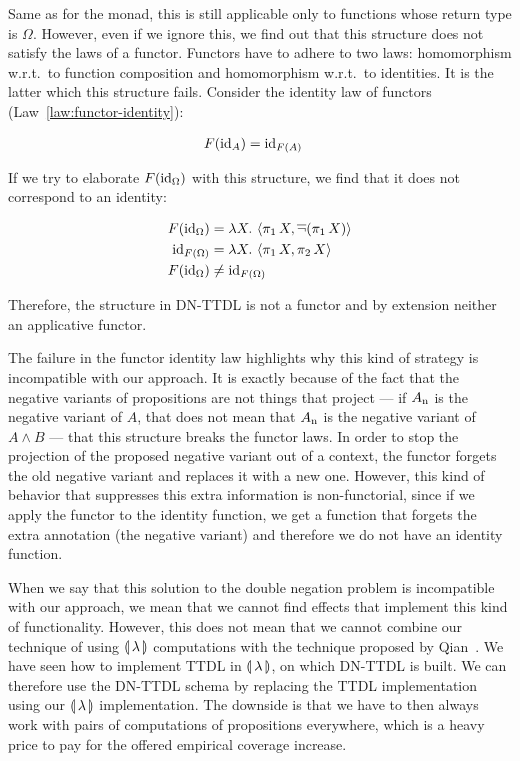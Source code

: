 Same as for the monad, this is still applicable only to functions whose
return type is $\Omega$. However, even if we ignore this, we find out that
this structure does not satisfy the laws of a functor. Functors have to
adhere to two laws: homomorphism w.r.t.\ to function composition and
homomorphism w.r.t.\ to identities. It is the latter which this structure
fails. Consider the identity law of functors
(Law~\eqref{law:functor-identity}):

\begin{align*}
  F(\mathrm{id}_A) &= \mathrm{id}_{F(A)}
\end{align*}

If we try to elaborate $F(\mathrm{id}_\Omega)$ with this structure, we find that it
does not correspond to an identity:

\begin{align*}
  F(\mathrm{id}_\Omega) &= \lambda X.\, \left< \pi_1\,X, \mathop{\overline{\lnot}}(\pi_1\,X) \right> \\
  \mathrm{id}_{F(\Omega)} &= \lambda X.\, \left< \pi_1\,X, \pi_2\,X \right> \\
  F(\mathrm{id}_\Omega) &\neq \mathrm{id}_{F(\Omega)}
\end{align*}

Therefore, the structure in DN-TTDL is not a functor and by extension
neither an applicative functor.

The failure in the functor identity law highlights why this kind of
strategy is incompatible with our approach. It is exactly because of the
fact that the negative variants of propositions are not things that project
--- if $A_{\mathrm{n}}$ is the negative variant of $A$, that does not mean that
$A_{\mathrm{n}}$ is the negative variant of $A \land B$ --- that this structure
breaks the functor laws. In order to stop the projection of the proposed
negative variant out of a context, the functor forgets the old negative
variant and replaces it with a new one. However, this kind of behavior that
suppresses this extra information is non-functorial, since if we apply the
functor to the identity function, we get a function that forgets the extra
annotation (the negative variant) and therefore we do not have an identity
function.

When we say that this solution to the double negation problem is
incompatible with our approach, we mean that we cannot find effects that
implement this kind of functionality. However, this does not mean that we
cannot combine our technique of using $\llparenthesis \, \lambda \, \rrparenthesis$ computations with
the technique proposed by Qian~\cite{qian2014accessibility}. We have seen
how to implement TTDL in $\llparenthesis \, \lambda \, \rrparenthesis$, on which DN-TTDL is built. We
can therefore use the DN-TTDL schema by replacing the TTDL implementation
using our $\llparenthesis \, \lambda \, \rrparenthesis$ implementation. The downside is that we have
to then always work with pairs of computations of propositions everywhere,
which is a heavy price to pay for the offered empirical coverage increase.


